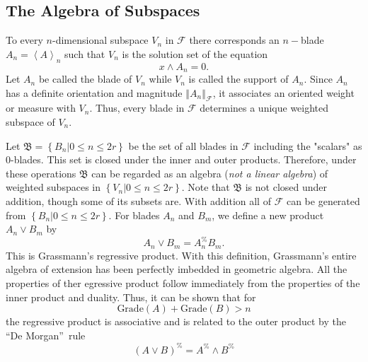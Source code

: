 \documentclass[aps,preprint]{revtex4}%
\begin{document}
\subsection{The Algebra of Subspaces}

To every $n$-dimensional subspace $V_{n}$ in $\mathcal{F}$ there corresponds
an $n-$blade $A_{n}=\left\langle A\right\rangle _{n}$ such that $V_{n}$ is the
solution set of the equation%
\begin{equation}
x\wedge A_{n}=0.
\end{equation}
Let $A_{n}$ be called the blade of $V_{n}$ while $V_{n}$ is called the support
of $A_{n}$. Since $A_{n}$ has a definite orientation and magnitude $\left\Vert
A_{n}\right\Vert _{\mathcal{F}}$, it associates an oriented weight or measure
with $V_{n}$. Thus, every blade in $\mathcal{F}$ determines a unique weighted
subspace of $V_{n}.$

Let $\mathfrak{B}=\left\{  \left.  B_{n}\right\vert 0\leq n\leq2r\right\}  $
be the set of all blades in $\mathcal{F}$ including the "scalars" as
$0$-blades. This set is closed under the inner and outer products. Therefore,
under these operations $\mathfrak{B}$ can be regarded as an algebra (\emph{not
a linear algebra}) of weighted subspaces in $\left\{  \left.  V_{n}\right\vert
0\leq n\leq2r\right\}  $. Note that $\mathfrak{B}$ is not closed under
addition, though some of its subsets are. With addition all of $\mathcal{F}$
can be generated from $\left\{  \left.  B_{n}\right\vert 0\leq n\leq
2r\right\}  $. For blades $A_{n}$ and $B_{m}$, we define a new product
$A_{n}\vee B_{m}$ by
\begin{equation}
A_{n}\vee B_{m}=A_{n}^{\%}B_{m}.
\end{equation}
This is Grassmann's regressive product. With this definition, Grassmann's
entire algebra of extension has been perfectly imbedded in geometric algebra.
All the properties of ther egressive product follow immediately from the
properties of the inner product and duality. Thus, it can be shown that for
\begin{equation}
\text{Grade}\left(  A\right)  +\text{Grade}\left(  B\right)  >n
\end{equation}
the regressive product is associative and is related to the outer product by
the \textquotedblleft De Morgan\textquotedblright\ rule%
\begin{equation}
(A\vee B)^{\%}=A^{\%}\wedge B^{\%}%
\end{equation}
\end{document}
